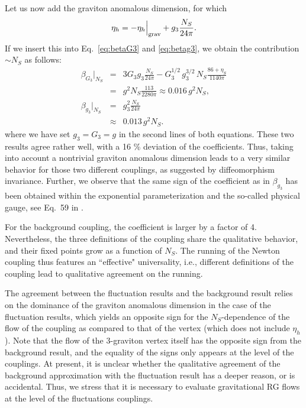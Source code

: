 \documentclass[11pt]{book} %
\newcommand{\be}{\begin{equation}}
\newcommand{\ee}{\end{equation}}
\newcommand{\bea}{\begin{eqnarray}}
\newcommand{\eea}{\end{eqnarray}}
\begin{document}
Let us now add the graviton anomalous dimension, for which
\be
\eta_h = -\eta_h\Big|_{\rm grav} + g_3 \frac{N_S}{24 \pi}.
\ee
If we insert this into Eq.~\eqref{eq:betaG3} and \eqref{eq:betag3}, we obtain the contribution $\sim N_S$ as follows:
\bea
\beta_{G_3}\Big|_{N_S}&=& 3 G_3 g_3 \frac{N_S}{24 \pi}  - G_3^{1/2} \,g_3^{3/2}\, N_S\frac{86+\eta_S}{1140 \pi}\nonumber\\
&=& g^2  N_S \frac{113}{2280 \pi} \approx 0.016\, g^2 N_S,\nonumber\\
\beta_{g_3} \Big|_{N_S}&=& g_3^2 \frac{N_S}{24 \pi}\nonumber\\
&\approx& 0.013 \,g^2 N_S.
\eea
where we have set $g_3 = G_3 = g$ in the second lines of both equations.
These two results agree rather well, with a 16 \% deviation of the coefficients.
Thus, taking into account a nontrivial graviton anomalous dimension leads to a very similar behavior for those two different couplings, as suggested by diffeomorphism invariance.
Further, we observe that the same sign of the coefficient as in $\beta_{g_3}$ has been obtained within the exponential parameterization and the so-called physical gauge, see Eq.~59 in \cite{Dona:2015tnf}.

For the background coupling, the coefficient is larger by a factor of 4. Nevertheless, the three definitions of the coupling share the qualitative behavior, and their fixed points grow as a function of $N_S$.
The running of the Newton coupling thus features an ``effective" universality, i.e., different definitions of the coupling lead to qualitative agreement on the running.


The agreement between the fluctuation results and the background result relies on the dominance of the graviton anomalous dimension in the case of the fluctuation results,
which yields an opposite sign for the $N_S$-dependence of the flow of the coupling as compared to that of the vertex (which does not include $\eta_h$).
Note that the flow of the 3-graviton vertex itself has the opposite sign from the background result, and the equality of the signs only appears at the level of the couplings.
At present, it is unclear whether the qualitative agreement of the background approximation with the fluctuation result has a deeper reason, or is accidental.
Thus, we stress that it is necessary to evaluate gravitational RG flows at the level of the fluctuations couplings.
\end{document}
